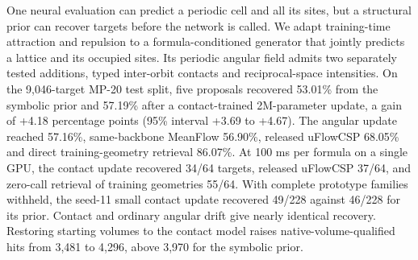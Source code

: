 One neural evaluation can predict a periodic cell and all its sites, but a structural prior can recover targets before the network is called. We adapt training-time attraction and repulsion to a formula-conditioned generator that jointly predicts a lattice and its occupied sites. Its periodic angular field admits two separately tested additions, typed inter-orbit contacts and reciprocal-space intensities. On the 9,046-target MP-20 test split, five proposals recovered 53.01\% from the symbolic prior and 57.19\% after a contact-trained 2M-parameter update, a gain of +4.18 percentage points (95\% interval +3.69 to +4.67). The angular update reached 57.16\%, same-backbone MeanFlow 56.90\%, released uFlowCSP 68.05\% and direct training-geometry retrieval 86.07\%. At 100 ms per formula on a single GPU, the contact update recovered 34/64 targets, released uFlowCSP 37/64, and zero-call retrieval of training geometries 55/64. With complete prototype families withheld, the seed-11 small contact update recovered 49/228 against 46/228 for its prior. Contact and ordinary angular drift give nearly identical recovery. Restoring starting volumes to the contact model raises native-volume-qualified hits from 3,481 to 4,296, above 3,970 for the symbolic prior.

